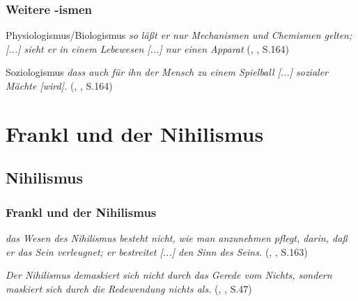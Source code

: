 \documentclass{beamer}
\begin{document}
\begin{frame}
\frametitle{Weitere \glqq{}-ismen\grqq{}}

  \begin{block}{Physiologismus/Biologismus}
  	\textit{\glqq{}so läßt er nur Mechanismen und Chemismen gelten; [...] sieht er in einem Lebewesen [...] nur einen Apparat\grqq{}} \footnotesize(\citeauthor{Frankl1996}, \citeyear{Frankl1996}, S.164)\normalsize	
  \end{block}
  
\vspace{0,5cm}
\pause
  

  \begin{block}{Soziologismus}
  	\textit{\glqq{}dass auch für ihn der Mensch zu einem Spielball [...] sozialer Mächte [wird].\grqq{}} \footnotesize(\citeauthor{Frankl1996}, \citeyear{Frankl1996}, S.164)\normalsize
  \end{block}
  
  
\end{frame}


\section{Frankl und der Nihilismus}
\subsection{Nihilismus}


\begin{frame}
\frametitle{Frankl und der Nihilismus}

  \begin{block}{}
  	\textit{\glqq{}das Wesen des Nihilismus besteht nicht, wie man anzunehmen pflegt, darin, daß er das Sein verleugnet; er bestreitet [...] den Sinn des Seins.\grqq{}} \footnotesize(\citeauthor{Frankl1996}, \citeyear{Frankl1996}, S.163)\normalsize
  \end{block}
  
\vspace{0,5cm}
\pause
  
  \begin{block}{}
  	\textit{\glqq{}Der Nihilismus demaskiert sich nicht durch das Gerede vom Nichts, sondern maskiert sich durch die Redewendung \textbf{\frqq{}}nichts als\textbf{\flqq{}}.\grqq{}} \footnotesize(\citeauthor{Frankl2015}, \citeyear{Frankl2015}, S.47)\normalsize
  \end{block}
  
\end{frame}
\end{document}
